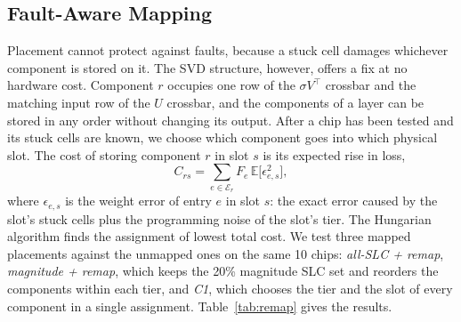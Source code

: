 \documentclass[conference]{IEEEtran}
\begin{document}
\subsection{Fault-Aware Mapping}
Placement cannot protect against faults, because a stuck cell damages whichever component is stored on it.
The SVD structure, however, offers a fix at no hardware cost. Component $r$ occupies one row of the
$\sigma V^{\top}$ crossbar and the matching input row of the $U$ crossbar, and the components of a layer can
be stored in any order without changing its output. After a chip has been tested and its stuck cells are
known, we choose which component goes into which physical slot. The cost of storing component $r$ in slot
$s$ is its expected rise in loss,
\begin{equation}
C_{rs}=\sum_{e\in\mathcal{E}_r}F_e\,\mathbb{E}\big[\epsilon_{e,s}^2\big],
\end{equation}
where $\epsilon_{e,s}$ is the weight error of entry $e$ in slot $s$: the exact error caused by the slot's
stuck cells plus the programming noise of the slot's tier. The Hungarian algorithm finds the assignment of
lowest total cost. We test three mapped placements against the unmapped ones on the same 10 chips:
\emph{all-SLC + remap}, \emph{magnitude + remap}, which keeps the 20\% magnitude SLC set and reorders the
components within each tier, and \emph{C1}, which chooses the tier and the slot of every component in a
single assignment. Table~\ref{tab:remap} gives the results.
\end{document}
